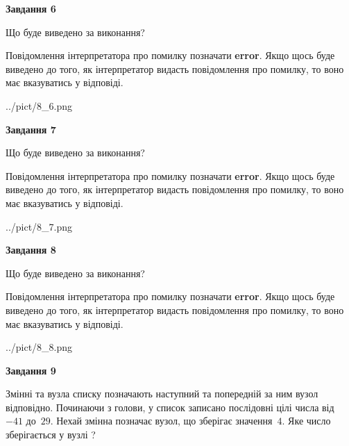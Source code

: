 \documentclass[12pt, ukrainian]{article}
\begin{document}
{\begin {large}
{\begin {center}\textbf{Завдання 6}\end {center}}\par
Що буде виведено за виконання?

Повідомлення інтерпретатора про помилку позначати \textbf{error}.
Якщо щось буде виведено до того, як інтерпретатор видасть повідомлення про помилку, 
то воно має вказуватись у відповіді. \par


\begin{center}
	{../pict/8_6.png}
\end{center}
\newpage

{\begin {center}\textbf{Завдання 7}\end {center}}\par
Що буде виведено за виконання?

Повідомлення інтерпретатора про помилку позначати \textbf{error}.
Якщо щось буде виведено до того, як інтерпретатор видасть повідомлення про помилку, 
то воно має вказуватись у відповіді. \par


\begin{center}
	{../pict/8_7.png}
\end{center}
\newpage

{\begin {center}\textbf{Завдання 8}\end {center}}\par
Що буде виведено за виконання?

Повідомлення інтерпретатора про помилку позначати \textbf{error}.
Якщо щось буде виведено до того, як інтерпретатор видасть повідомлення про помилку, 
то воно має вказуватись у відповіді. \par


\begin{center}
	{../pict/8_8.png}
\end{center}
\newpage

{\begin {center}\textbf{Завдання 9}\end {center}}\par
Змінні  та  вузла списку позначають наступний та попередній за ним вузол відповідно. Починаючи з голови, у список записано послідовні цілі числа від~$-41$ до~$29$. Нехай змінна  позначає вузол, що зберігає значення~$4$.
Яке число зберігається у вузлі  ?\par
\newpage


\end{large}}
\end{document}
